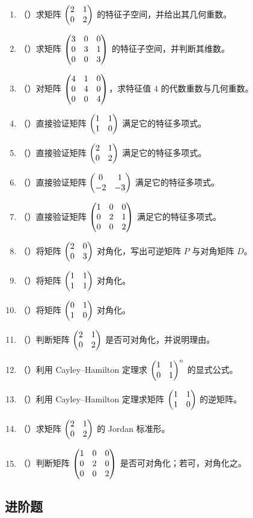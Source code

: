 \begin{enumerate}[label=\arabic*., leftmargin=2.8em]
  \item （\basic）求矩阵 \(\begin{pmatrix} 2&1\\0&2 \end{pmatrix}\) 的特征子空间，并给出其几何重数。
  \item （\basic）求矩阵 \(\begin{pmatrix} 3&0&0\\0&3&1\\0&0&3 \end{pmatrix}\) 的特征子空间，并判断其维数。
  \item （\basic）对矩阵 \(\begin{pmatrix} 4&1&0\\0&4&0\\0&0&4 \end{pmatrix}\)，求特征值 \(4\) 的代数重数与几何重数。
  \item （\basic）直接验证矩阵 \(\begin{pmatrix} 1&1\\1&0 \end{pmatrix}\) 满足它的特征多项式。
  \item （\basic）直接验证矩阵 \(\begin{pmatrix} 2&1\\0&2 \end{pmatrix}\) 满足它的特征多项式。
  \item （\basic）直接验证矩阵 \(\begin{pmatrix} 0&1\\-2&-3 \end{pmatrix}\) 满足它的特征多项式。
  \item （\basic）直接验证矩阵 \(\begin{pmatrix} 1&0&0\\0&2&1\\0&0&2 \end{pmatrix}\) 满足它的特征多项式。
  \item （\basic）将矩阵 \(\begin{pmatrix} 2&0\\0&3 \end{pmatrix}\) 对角化，写出可逆矩阵 \(P\) 与对角矩阵 \(D\)。
  \item （\basic）将矩阵 \(\begin{pmatrix} 1&1\\1&1 \end{pmatrix}\) 对角化。
  \item （\basic）将矩阵 \(\begin{pmatrix} 0&1\\1&0 \end{pmatrix}\) 对角化。
  \item （\basic）判断矩阵 \(\begin{pmatrix} 2&1\\0&2 \end{pmatrix}\) 是否可对角化，并说明理由。
  \item （\basic）利用 Cayley--Hamilton 定理求 $\begin{pmatrix} 1&1\\0&1 \end{pmatrix}^n$ 的显式公式。
  \item （\basic）利用 Cayley--Hamilton 定理求矩阵 \(\begin{pmatrix} 1&1\\1&0 \end{pmatrix}\) 的逆矩阵。
  \item （\basic）求矩阵 \(\begin{pmatrix} 2&1\\0&2 \end{pmatrix}\) 的 Jordan 标准形。
  \item （\basic）判断矩阵 \(\begin{pmatrix} 1&0&0\\0&2&0\\0&0&2 \end{pmatrix}\) 是否可对角化；若可，对角化之。
\end{enumerate}

\subsection*{进阶题}

